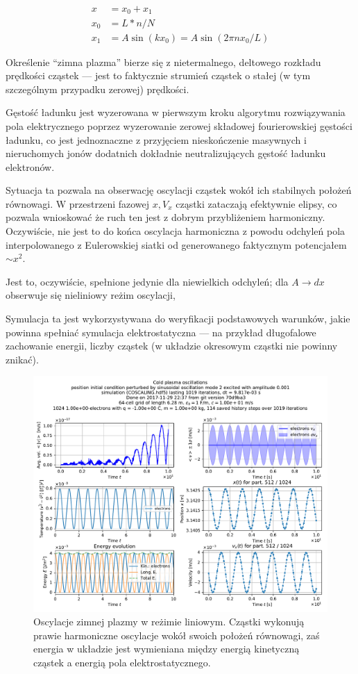 \begin{align}
x &= x_0 + x_1\\
x_0 &= L * n / N\\
x_1 &= A  \sin(k x_0) = A \sin(2 \pi n x_0 / L)
\end{align}

Określenie ``zimna plazma'' bierze się z nietermalnego, deltowego
rozkładu prędkości cząstek --- jest to faktycznie strumień cząstek o stałej
(w tym szczególnym przypadku zerowej) prędkości.

Gęstość ładunku jest wyzerowana w pierwszym kroku algorytmu rozwiązywania pola elektrycznego
poprzez wyzerowanie zerowej składowej fourierowskiej gęstości ładunku, co jest jednoznaczne
z przyjęciem nieskończenie masywnych i nieruchomych jonów dodatnich dokładnie neutralizujących gęstość
ładunku elektronów.

Sytuacja ta
pozwala na obserwację oscylacji cząstek wokół ich stabilnych położeń
równowagi. W przestrzeni fazowej $x, V_x$ cząstki zataczają efektywnie
elipsy, co pozwala wnioskować że ruch ten jest z dobrym przybliżeniem harmoniczny.
Oczywiście, nie jest to do końca oscylacja harmoniczna z powodu odchyleń pola interpolowanego
z Eulerowskiej siatki od generowanego faktycznym potencjałem $ \sim x^2 $.

Jest to, oczywiście, spełnione jedynie dla niewielkich odchyleń; dla $A \to
dx$ obserwuje się nieliniowy reżim oscylacji, 

Symulacja ta jest wykorzystywana do weryfikacji podstawowych warunków, jakie powinna spełniać
symulacja elektrostatyczna --- na przykład długofalowe zachowanie energii, liczby cząstek (w układzie okresowym cząstki nie powinny
znikać).

\begin{figure}[h!]
  \includegraphics[width=\textwidth]{Images/COSCALING}
  \caption{Oscylacje zimnej plazmy w reżimie liniowym. Cząstki wykonują prawie harmoniczne oscylacje wokół swoich położeń równowagi, zaś energia
   w układzie jest wymieniana między energią kinetyczną cząstek a energią pola elektrostatycznego.\label{fig:coldplasma-linear}}
\end{figure}

